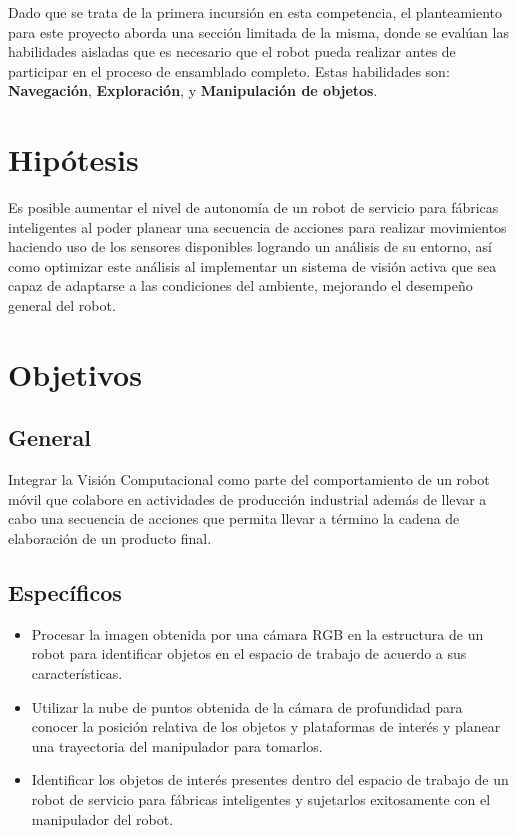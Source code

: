 Dado que se trata de la primera incursión en esta competencia, el planteamiento para este proyecto aborda una sección limitada de la misma, donde se evalúan las habilidades aisladas que es necesario que el robot pueda realizar antes de participar en el proceso de ensamblado completo. Estas habilidades son: \textbf{Navegación}, \textbf{Exploración}, y \textbf{Manipulación de objetos}. 

\section{Hipótesis}
Es posible aumentar el nivel de autonomía de un robot de servicio para fábricas inteligentes al poder planear una secuencia de acciones para realizar movimientos haciendo uso de los sensores disponibles logrando un análisis de su entorno, así como optimizar este análisis al implementar un sistema de visión activa que sea capaz de adaptarse a las condiciones del ambiente, mejorando el desempeño general del robot.

\section{Objetivos}
\subsection{General}
Integrar la Visión Computacional como parte del comportamiento de un robot móvil que colabore en actividades de producción industrial además de  llevar a cabo una secuencia de acciones que permita llevar a término la cadena de elaboración de un producto final.
\subsection{Específicos}
\begin{itemize}
    \item Procesar la imagen obtenida por una cámara RGB en la estructura de un robot para identificar objetos en el espacio de trabajo de acuerdo a sus características.
    \item Utilizar la nube de puntos  obtenida de la cámara de profundidad para conocer la posición relativa de los objetos y plataformas de interés y planear una trayectoria del manipulador para tomarlos. 
    \item Identificar los objetos de interés presentes dentro del espacio de trabajo de un robot de servicio para fábricas inteligentes y sujetarlos exitosamente con el manipulador del robot.
\end{itemize}
